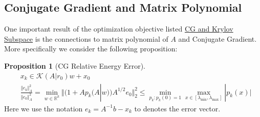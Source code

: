 \documentclass[]{article}
\theoremstyle{definition}
\newtheorem{prop}{Proposition}[section]  %
\begin{document}
    \subsection{Conjugate Gradient and Matrix Polynomial}
        One important result of the optimization objective listed \hyperref[theorem:CG_and_Krylov_Subspace]{CG and Krylov Subspace} is the connections to matrix polynomial of $A$ and Conjugate Gradient. More specifically we consider the following proposition: 
        \begin{prop}[CG Relative Energy Error]\label{prop:CG_Relative_Energy Error}
            \begin{align}
                & x_k \in \mathcal{K}(A|r_0)w + x_0
                \\
                & \frac{\Vert e_k\Vert_A^2}{\Vert e_0\Vert_A^2}
                = 
                \min_{w\in \mathbb R^k} 
                \Vert
                    (1 + Ap_k(A|w))A^{1/2}e_0
                \Vert_2^2
                \le
                \min_{p_{k}: p_{k}(0) = 1}\max_{x\in [\lambda_{\text{min}}, \lambda_{\text{max}}
                ]} |p_k(x)|
            \end{align}
            Here we use the notation $e_k = A^{-1}b - x_k$ to denotes the error vector. 
        \end{prop}
\end{document}
